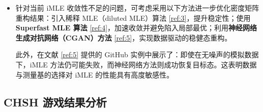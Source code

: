 \begin{itemize}
	最终获得的密度矩阵为：
	\[
	\rho_{\text{MLE}} =
	\begin{bmatrix}
		0.433 & 0.210 - 0.139i & 0.192 - 0.131i & 0.130 - 0.334i \\
		0.210 + 0.139i & 0.146 & 0.135 - 0.002i & 0.170 - 0.120i \\
		0.192 + 0.131i & 0.135 + 0.002i & 0.125 & 0.159 - 0.109i \\
		0.130 + 0.334i & 0.170 + 0.120i & 0.159 + 0.109i & 0.296 \\
	\end{bmatrix}
	\]
	
	计算其与目标 Bell 态的保真度得：
	\[
	F_{\text{MLE}} = 0.7030
	\]
	
	这一结果低于线性反演所得保真度，也\textbf{显著低于实验室程序计算}所得 $F \approx 0.9213$。这表明在本实验数据及选择的测量基下，\textbf{iMLE 方法的收敛质量较差}，可能由于：投影测量设置未能充分涵盖高灵敏方向（参见 \cref{ref:5}）；观测概率分布中存在统计波动，影响 MLE 收敛；本实验中所用 iMLE 算法迭代方式为最基础型，未做稀释（dilution）或超加速（superfast）优化。
	
	\item 针对当前 iMLE 收敛性不足的问题，可考虑采用以下方法进一步优化密度矩阵重构结果：引入稀释 MLE（diluted MLE）算法 \cref{ref:3}，提升稳定性；使用 \textbf{Superfast MLE 算法} \cref{ref:4}，加速收敛并避免陷入局部最优；利用\textbf{神经网络生成对抗网络（CGAN）方法} \cref{ref:5}，实现数据驱动的稳健态重构。
	
	此外，在文献 \cref{ref:5} 提供的 GitHub 实例中展示了：即使在无噪声的模拟数据下，iMLE 方法仍可能失败，而神经网络方法则成功恢复目标态。这表明数据与测量基的选择对 iMLE 的性能具有高度敏感性。
\end{itemize}

\subsection{CHSH 游戏结果分析}

